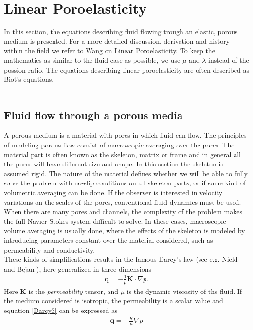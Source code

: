 \section{Linear Poroelasticity}
In this section, the equations describing fluid flowing trough an elastic, porous medium is presented. For a more detailed discussion, derivation and history within the field we refer to Wang \cite{Wang00} on Linear Poroelasticity. To keep the mathematics as similar to the fluid case as possible, we use $\mu$ and $\lambda$ instead of the possion ratio. The equations describing linear poroelasticity are often described as Biot's equations. 
\\
\\
\subsection{Fluid flow through a porous media}
A porous medium is a material with pores in which fluid can flow. The principles of modeling porous flow consist of macroscopic averaging over the pores. The material part is often known as the skeleton, matrix or frame and in general all the pores will have different size and shape. In this section the skeleton is assumed rigid. The nature of the material defines whether we will be able to fully solve the problem with no-slip conditions on all skeleton parts, or if some kind of volumetric averaging can be done. If the observer is interested in velocity variations on the scales of the pores, conventional fluid dynamics must be used. When there are many pores and channels, the complexity of the problem makes the full Navier-Stokes system difficult to solve. In these cases, macroscopic volume averaging is usually done, where the effects of the skeleton is modeled by introducing parameters constant over the material considered, such as permeability and conductivity. 
\\
These kinds of simplifications results in the famous Darcy's law (see e.g. Nield and Bejan \cite{Niel13}), here generalized in three dimensions
\begin{align}
\mathbf{q} = -\frac{1}{\mu} \mathbf{K} \cdot \nabla p \label{Darcy3}.
\end{align}
Here $\mathbf{K}$ is the \textit{permeability} tensor, and $\mu$ is the dynamic viscosity of the fluid. If the medium considered is isotropic, the permeability is a scalar value and equation \eqref{Darcy3} can be expressed as
\begin{align}
\mathbf{q} = -\frac{K}{\mu} \nabla p \label{Darcy}
\end{align}
